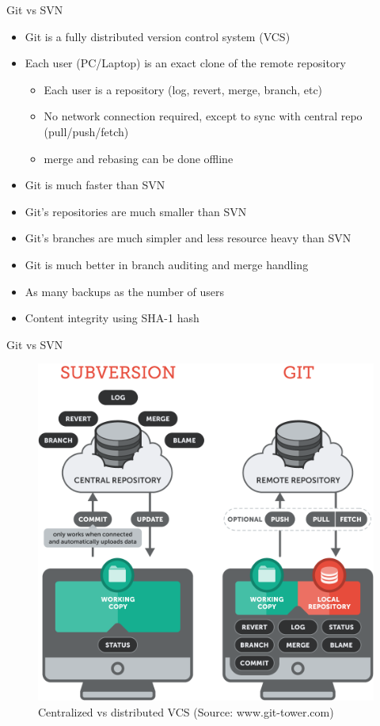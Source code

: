 \begin{frame}{Git vs SVN}
\begin{itemize}
  \item Git is a fully distributed version control system (VCS)
  \item Each user (PC/Laptop) is an exact clone of the remote repository
    \begin{itemize}
      \item Each user is a repository (log, revert, merge, branch, etc)
      \item No network connection required, except to sync with central repo (pull/push/fetch)
      \item merge and rebasing can be done offline
    \end{itemize}
  \item Git is much faster than SVN
  \item Git's repositories are much smaller than SVN
  \item Git's branches are much simpler and less resource heavy than SVN
  \item Git is much better in branch auditing and merge handling
  \item As many backups as the number of users
  \item Content integrity using SHA-1 hash
  \end{itemize}
\end{frame}

\begin{frame}{Git vs SVN}
  \begin{figure}
    \begin{center}
    \includegraphics[width=0.5\linewidth]{pics/git-vs-svn.png}
    \vspace{-0.3cm}
    \caption{\footnotesize Centralized vs distributed VCS (Source: www.git-tower.com)}
  \end{center}
\end{figure}
\end{frame}

